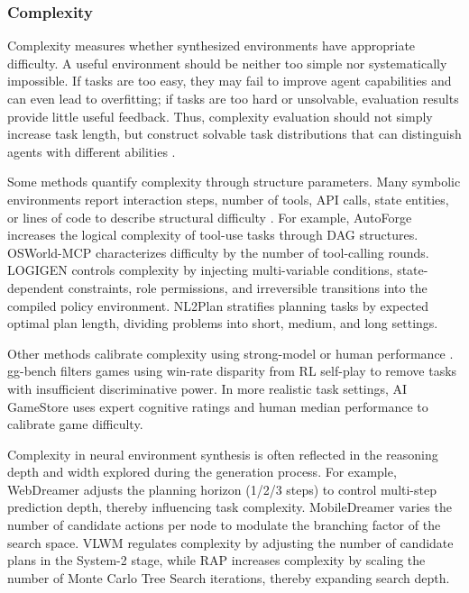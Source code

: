 \documentclass{llmxive}
\begin{document}
\subsubsection{Complexity}

Complexity measures whether synthesized environments have appropriate difficulty. A useful environment should be neither too simple nor systematically impossible. If tasks are too easy, they may fail to improve agent capabilities and can even lead to overfitting; if tasks are too hard or unsolvable, evaluation results provide little useful feedback. Thus, complexity evaluation should not simply increase task length, but construct solvable task distributions that can distinguish agents with different abilities \cite{AgentSynth, TaskCraft, VeriEnv}.

Some methods quantify complexity through structure parameters. Many symbolic environments report interaction steps, number of tools, API calls, state entities, or lines of code to describe structural difficulty \cite{PaperArena, MedAgentBench}. For example, AutoForge \cite{AutoForge} increases the logical complexity of tool-use tasks through DAG structures. OSWorld-MCP \cite{OSWorld-MCP} characterizes difficulty by the number of tool-calling rounds. LOGIGEN \cite{LOGIGEN} controls complexity by injecting multi-variable conditions, state-dependent constraints, role permissions, and irreversible transitions into the compiled policy environment. NL2Plan \cite{NL2Plan} stratifies planning tasks by expected optimal plan length, dividing problems into short, medium, and long settings.

Other methods calibrate complexity using strong-model or human performance \cite{SWE-smith, gg-bench, AI_GAMESTORE}. gg-bench \cite{gg-bench} filters games using win-rate disparity from RL self-play to remove tasks with insufficient discriminative power. In more realistic task settings, AI GameStore \cite{AI_GAMESTORE} uses expert cognitive ratings and human median performance to calibrate game difficulty.

Complexity in neural environment synthesis is often reflected in the reasoning depth and width explored during the generation process. For example, WebDreamer \cite{WebDreamer} adjusts the planning horizon (1/2/3 steps) to control multi-step prediction depth, thereby influencing task complexity. MobileDreamer \cite{MobileDreamer} varies the number of candidate actions per node to modulate the branching factor of the search space. VLWM \cite{VLWM} regulates complexity by adjusting the number of candidate plans in the System-2 stage, while RAP \cite{RAP} increases complexity by scaling the number of Monte Carlo Tree Search iterations, thereby expanding search depth.
\end{document}
